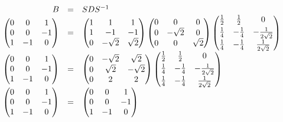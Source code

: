 \documentclass[a4paper]{article}
\makeatletter
\newenvironment{rowequmat}[1]{\left(\array{@{}#1@{}}}{\endarray\right)}
\makeatother
\begin{document}
	\begin{equation*}
		\begin{array}{rcl}
			B &=& SDS^{-1} \\
			\begin{pmatrix}
				0 & 0 & 1 \\
				0 & 0 & -1 \\
				1 & -1 & 0
			\end{pmatrix} &=&
			\begin{pmatrix}
				1 & 1			& 1			\\
				1 & -1			& -1		\\
				0 & -\sqrt{2}	& \sqrt{2}	\\
			\end{pmatrix}
			\begin{pmatrix}
				0 & 0 & 0 \\
				0 & -\sqrt{2} & 0 \\
				0 & 0 & \sqrt{2}
			\end{pmatrix}
			\begin{rowequmat}{ccc}
				\frac{1}{2} & \frac{1}{2} & 0 \\ [.3em]
				\frac{1}{4} & -\frac{1}{4} & -\frac{1}{2\sqrt{2}} \\ [.3em]
				\frac{1}{4} & -\frac{1}{4} & \frac{1}{2\sqrt{2}}
			\end{rowequmat} \\
			\begin{pmatrix}
				0 & 0 & 1 \\
				0 & 0 & -1 \\
				1 & -1 & 0
			\end{pmatrix} &=&
			\begin{pmatrix}
				0	& -\sqrt{2} & \sqrt{2} \\
				0	& \sqrt{2} & -\sqrt{2} \\
				0	& 2 & 2
			\end{pmatrix}
			\begin{rowequmat}{ccc}
				\frac{1}{2} & \frac{1}{2} & 0 \\ [.3em]
				\frac{1}{4} & -\frac{1}{4} & -\frac{1}{2\sqrt{2}} \\ [.3em]
				\frac{1}{4} & -\frac{1}{4} & \frac{1}{2\sqrt{2}}
			\end{rowequmat} \\
			\begin{pmatrix}
				0 & 0 & 1 \\
				0 & 0 & -1 \\
				1 & -1 & 0
			\end{pmatrix} &=&
			\begin{pmatrix}
				0 & 0 & 1 \\
				0 & 0 & -1 \\
				1 & -1 & 0
			\end{pmatrix}
		\end{array}
	\end{equation*}\newpage
	
\end{document}
